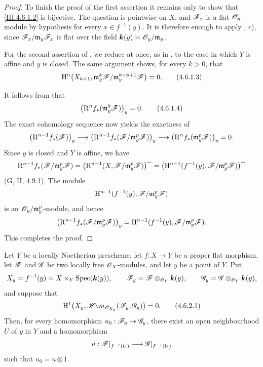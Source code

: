 \begin{proof}
To finish the proof of the first assertion it remains only to show
that \eqref{III.4.6.1.2} is bijective.  The question is pointwise on
$X$, and $\mathscr{F}_x$ is a flat $\mathscr{O}_y$-module by hypothesis for
every $x\in f^{-1}(y)$.  It is therefore enough to apply
, c), since
$\mathscr{F}_x/\mathfrak m_y\mathscr{F}_x$ is flat over the field
$\boldsymbol{k}(y)=\mathscr{O}_y/\mathfrak m_y$.

For the second assertion of , we reduce at once, as
in , to the case in which $Y$ is affine and $y$ is
closed.  The same argument shows, for every $k>0$, that
\[
\label{III.4.6.1.3}
  \mathrm{H}^n\bigl(X_{k+1},
    \mathfrak m_y^k\mathscr{F}/
      \mathfrak m_y^{k+p+1}\mathscr{F}\bigr)=0.
  \tag{4.6.1.3}
\]


It follows from  that
\[
\label{III.4.6.1.4}
  \bigl(\mathrm{R}^n f_*(\mathfrak m_y^k\mathscr{F})\bigr)_y=0.
  \tag{4.6.1.4}
\]
The exact cohomology sequence now yields the exactness of
\[
  \bigl(\mathrm{R}^{n-1}f_*(\mathscr{F})\bigr)_y
  \longrightarrow
  \bigl(\mathrm{R}^{n-1}f_*
    (\mathscr{F}/\mathfrak m_y^p\mathscr{F})\bigr)_y
  \longrightarrow
  \bigl(\mathrm{R}^n f_*(\mathfrak m_y^p\mathscr{F})\bigr)_y=0.
\]
Since $y$ is closed and $Y$ is affine, we have
\[
  \mathrm{R}^{n-1}f_*(\mathscr{F}/\mathfrak m_y^p\mathscr{F})
  =
  \bigl(\mathrm{H}^{n-1}
    (X,\mathscr{F}/\mathfrak m_y^p\mathscr{F})\bigr)^{\sim}
  =
  \bigl(\mathrm{H}^{n-1}
    (f^{-1}(y),\mathscr{F}/\mathfrak m_y^p\mathscr{F})\bigr)^{\sim}
\]
(G, II, 4.9.1).  The module
\[
  \mathrm{H}^{n-1}
    (f^{-1}(y),\mathscr{F}/\mathfrak m_y^p\mathscr{F})
\]
is an $\mathscr{O}_y/\mathfrak m_y^p$-module, and hence
\[
  \bigl(\mathrm{R}^{n-1}f_*
    (\mathscr{F}/\mathfrak m_y^p\mathscr{F})\bigr)_y
  =
  \mathrm{H}^{n-1}
    (f^{-1}(y),\mathscr{F}/\mathfrak m_y^p\mathscr{F}).
\]
This completes the proof.
\end{proof}

\begin{corollary}[4.6.2]
\label{III.4.6.2}
Let $Y$ be a locally Noetherian prescheme, let $f:X\to Y$ be a
proper flat morphism, let $\mathscr{F}$ and $\mathscr{G}$ be two locally free
$\mathscr{O}_X$-modules, and let $y$ be a point of $Y$.  Put
\[
  X_y=f^{-1}(y)=X\times_Y\operatorname{Spec}(\boldsymbol{k}(y)),\qquad
  \mathscr{F}_y=\mathscr{F}\otimes_{\mathscr{O}_Y}\boldsymbol{k}(y),\qquad
  \mathscr{G}_y=\mathscr{G}\otimes_{\mathscr{O}_Y}\boldsymbol{k}(y),
\]
and suppose that
\[
\label{III.4.6.2.1}
  \mathrm{H}^1\bigl(
    X_y,\mathscr{H}\!\mathit{om}_{\mathscr{O}_{X_y}}(\mathscr{F}_y,\mathscr{G}_y)
  \bigr)=0.
  \tag{4.6.2.1}
\]
Then, for every homomorphism $u_0:\mathscr{F}_y\to\mathscr{G}_y$, there exist
an open neighbourhood $U$ of $y$ in $Y$ and a homomorphism
\[
  u:\mathscr{F}|_{f^{-1}(U)}\longrightarrow
    \mathscr{G}|_{f^{-1}(U)}
\]
such that $u_0=u\otimes1$.
\end{corollary}

